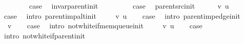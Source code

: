 \begin{isabellebody}
\isanewline
{}\isamarkupfalse%
\isanewline
\ \ \isamarkupfalse%
\ {}\isanewline
\ \ \isamarkupfalse%
\ {\isacharquery}{\kern0pt}case\ \isamarkupfalse%
\ invar{\isacharunderscore}{\kern0pt}parent{\isacharunderscore}{\kern0pt}init\ \isacommand{{\isachardot}{\kern0pt}}\isamarkupfalse%
\isanewline
{}\isamarkupfalse%
\isanewline
\ \ \isamarkupfalse%
\ {}\isanewline
\ \ \isamarkupfalse%
\ {\isacharquery}{\kern0pt}case\ \isamarkupfalse%
\ parent{\isacharunderscore}{\kern0pt}src{\isacharunderscore}{\kern0pt}init\ \isacommand{{\isachardot}{\kern0pt}}\isamarkupfalse%
\isanewline
{}\isamarkupfalse%
\isanewline
\ \ \isamarkupfalse%
\ {\isacharparenleft}{\kern0pt}{}\ v\ u{\isacharparenright}{\kern0pt}\isanewline
\ \ \isamarkupfalse%
\ {\isacharquery}{\kern0pt}case\ \isamarkupfalse%
\ {\isacharparenleft}{\kern0pt}intro\ parent{\isacharunderscore}{\kern0pt}imp{\isacharunderscore}{\kern0pt}alt{\isacharunderscore}{\kern0pt}init{\isacharparenright}{\kern0pt}\isanewline
{}\isamarkupfalse%
\isanewline
\ \ \isamarkupfalse%
\ {\isacharparenleft}{\kern0pt}{}\ v\ u{\isacharparenright}{\kern0pt}\isanewline
\ \ \isamarkupfalse%
\ {\isacharquery}{\kern0pt}case\ \isamarkupfalse%
\ {\isacharparenleft}{\kern0pt}intro\ parent{\isacharunderscore}{\kern0pt}imp{\isacharunderscore}{\kern0pt}edge{\isacharunderscore}{\kern0pt}init{\isacharparenright}{\kern0pt}\isanewline
{}\isamarkupfalse%
\isanewline
\ \ \isamarkupfalse%
\ {\isacharparenleft}{\kern0pt}{}\ v{\isacharparenright}{\kern0pt}\isanewline
\ \ \isamarkupfalse%
\ {\isacharquery}{\kern0pt}case\ \isamarkupfalse%
\ {\isacharparenleft}{\kern0pt}intro\ not{\isacharunderscore}{\kern0pt}white{\isacharunderscore}{\kern0pt}if{\isacharunderscore}{\kern0pt}mem{\isacharunderscore}{\kern0pt}queue{\isacharunderscore}{\kern0pt}init{\isacharparenright}{\kern0pt}\isanewline
{}\isamarkupfalse%
\isanewline
\ \ \isamarkupfalse%
\ {\isacharparenleft}{\kern0pt}{}\ v\ u{\isacharparenright}{\kern0pt}\isanewline
\ \ \isamarkupfalse%
\ {\isacharquery}{\kern0pt}case\ \isamarkupfalse%
\ {\isacharparenleft}{\kern0pt}intro\ not{\isacharunderscore}{\kern0pt}white{\isacharunderscore}{\kern0pt}if{\isacharunderscore}{\kern0pt}parent{\isacharunderscore}{\kern0pt}init{\isacharparenright}{\kern0pt}\isanewline

\end{isabellebody}
